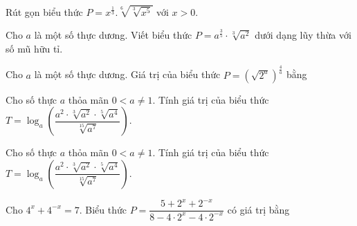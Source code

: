 \begin{ex}%
	Rút gọn  biểu thức $P=x^{\tfrac{1}{3}}.\sqrt[6]{\sqrt[3]{x^5}}$ với $x > 0$.
\end{ex}

\begin{ex}%
	Cho $a$ là một số thực dương. Viết biểu  thức $P=a^{\tfrac{3}{5}}\cdot\sqrt[3]{a^2}$ dưới dạng lũy thừa với số mũ hữu tỉ.
\end{ex}

\begin{ex}%
	Cho $a$ là một số thực dương. Giá trị của biểu thức $P=\left(\sqrt{2^a}  \right)^{\tfrac{4}{a}}$ bằng
\end{ex}

\begin{bt}%
	Cho số thực $a$ thỏa mãn $0< a\ne 1$. Tính giá trị của biểu thức $T=\log_a \left(\dfrac{a^2 \cdot \sqrt[{3}]{a^2}  \cdot \sqrt[{5}]{a^4}}{\sqrt[{15}]{a^7}} \right)$.
\end{bt}

\begin{ex}%
	Cho số thực $a$ thỏa mãn $0< a\ne 1$. Tính giá trị của biểu thức $T=\log_a \left(\dfrac{a^2 \cdot \sqrt[{3}]{a^2} \cdot \sqrt[{5}]{a^4}}{\sqrt[{15}]{a^7}} \right)$. 
\end{ex}

\begin{ex}%
	Cho $4^x+4^{-x}=7$. Biểu thức $P=\dfrac{5+2^x+2^{-x}}{8-4\cdot 2^x-4\cdot 2^{-x}}$ có giá trị  bằng
\end{ex}

